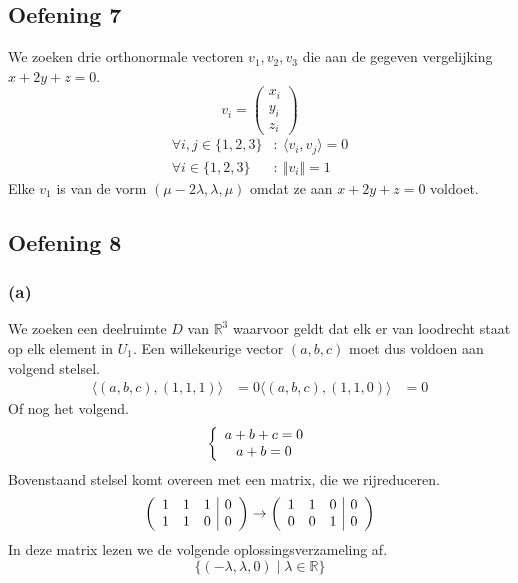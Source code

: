 \documentclass[lineaire_algebra_oplossingen.tex]{subfiles}
\begin{document}
\subsection{Oefening 7}
We zoeken drie orthonormale vectoren $v_1,v_2,v_3$ die aan de gegeven vergelijking $x+2y+z = 0$.
\[
v_i =
\begin{pmatrix}
x_i\\y_i\\z_i
\end{pmatrix}
\]
\begin{align*}
\forall i,j\in \{1,2,3\} &: \ \langle v_i,v_j\rangle = 0 \\
\forall i\in \{1,2,3\} &: \ \Vert v_i\Vert = 1
\end{align*}
Elke $v_1$ is van de vorm $(\mu - 2\lambda,\lambda,\mu)$ omdat ze aan $x+2y+z=0$ voldoet.

\subsection{Oefening 8}
\subsubsection*{(a)}
We zoeken een deelruimte $D$ van $\mathbb{R}^3$ waarvoor geldt dat elk er van loodrecht staat op elk element in $U_1$. Een willekeurige vector $(a,b,c)$ moet dus voldoen aan volgend stelsel.
\begin{align*}
\langle (a,b,c),(1,1,1)\rangle &= 0
\langle (a,b,c),(1,1,0)\rangle &= 0
\end{align*}
Of nog het volgend.
\[
\left\{
\begin{array}{c c}
a+b+c=0\\
a+b=0
\end{array}
\right.
\]
Bovenstaand stelsel komt overeen met een matrix, die we rijreduceren.
\[
\left(
\begin{array}{c c c  | c}
1&1&1&0\\
1&1&0&0
\end{array}
\right)
\rightarrow
\left(
\begin{array}{c c c  | c}
1&1&0&0\\
0&0&1&0
\end{array}
\right)
\]
In deze matrix lezen we de volgende oplossingsverzameling af.
\[
\{ (-\lambda,\lambda,0) \mid \lambda\in\mathbb{R}\}
\]
\end{document}
